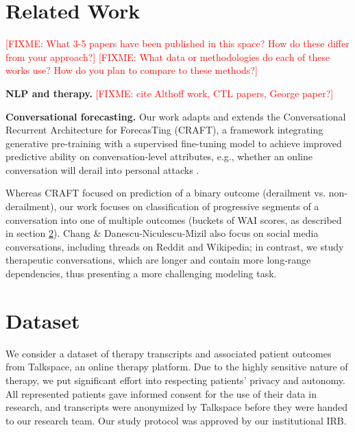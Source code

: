 \documentclass{article}
\newcommand{\fixme}[1]{\textcolor{red}{[FIXME: #1]}}
\begin{document}
\section{Related Work}
\label{sec:related-work}

\fixme{What 3-5 papers have been published in this space? How do these differ from your approach?}
\fixme{What data or methodologies do each of these works use? How do you plan to compare to these methods?}


\textbf{NLP and therapy.} \fixme{cite Althoff work, CTL papers, George paper?}

\textbf{Conversational forecasting.} Our work adapts and extends the Conversational Recurrent Architecture for ForecasTing (CRAFT), a framework integrating generative pre-training with a supervised fine-tuning model to achieve improved predictive ability on conversation-level attributes, e.g., whether an online conversation will derail into personal attacks \cite{Chang-Trouble:19}. 

Whereas CRAFT focused on prediction of a binary outcome (derailment vs. non-derailment), our work focuses on classification of progressive segments of a conversation into one of multiple outcomes (buckets of WAI scores, as described in section \ref{sec:dataset}). Chang \& Danescu-Niculescu-Mizil \citeyear{Chang-Trouble:19} also focus on social media conversations, including threads on Reddit and Wikipedia; in contrast, we study therapeutic conversations, which are longer and contain more long-range dependencies, thus presenting a more challenging modeling task.

\section{Dataset}
\label{sec:dataset}

We consider a dataset of therapy transcripts and associated patient outcomes from Talkspace, an online therapy platform. Due to the highly sensitive nature of therapy, we put significant effort into respecting patients' privacy and autonomy. All represented patients gave informed consent for the use of their data in research, and transcripts were anonymized by Talkspace before they were handed to our research team. Our study protocol was approved by our institutional IRB.
\end{document}
